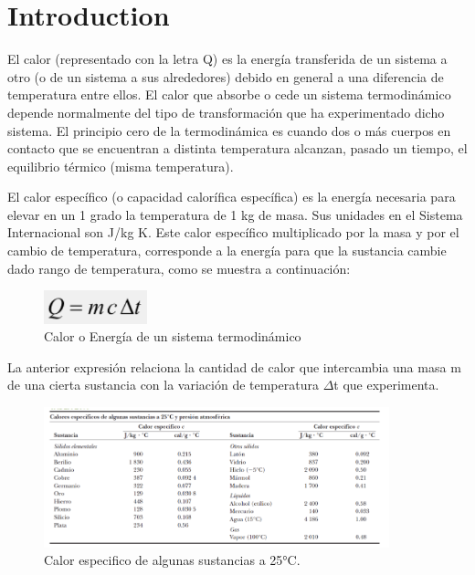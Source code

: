 \documentclass[journal,transmag]{IEEEtran}
\begin{document}
\section{Introduction}
	
	El calor (representado con la letra Q) es la energía transferida de un sistema a otro (o de un sistema a sus alrededores) debido en general a una diferencia de temperatura entre ellos. El calor que absorbe o cede un sistema termodinámico depende normalmente del tipo de transformación que ha experimentado dicho sistema.
El principio cero de la termodinámica es cuando dos o más cuerpos en contacto que se encuentran a distinta temperatura alcanzan, pasado un tiempo, el equilibrio térmico (misma temperatura).

El calor específico (o capacidad calorífica específica) es la energía necesaria para elevar en un 1 grado la temperatura de 1 kg de masa. Sus unidades en el Sistema Internacional son J/kg K. Este calor específico multiplicado por la masa y por el cambio de temperatura, corresponde a la energía para que la sustancia cambie dado rango de temperatura, como se muestra a continuación:
 \begin{figure}[!h]
			\center
			\includegraphics[width=3cm]{img/eq1.png}
			\caption{Calor o Energía de un sistema termodinámico}
			\label{f1}
		\end{figure}

La anterior expresión relaciona la cantidad de calor que intercambia una masa m de una cierta sustancia con la variación de temperatura $\Delta$t que experimenta.  

\begin{figure}[!h]
			\center
			\includegraphics[width=10cm]{img/fig1.png}
			\caption{Calor especifico de algunas sustancias a 25°C.}
			\label{f1}
		\end{figure}
\end{document}
